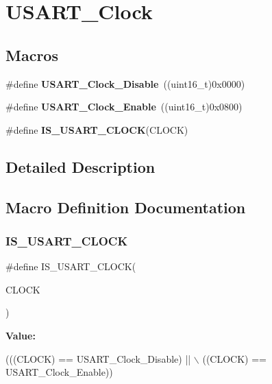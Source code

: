 \section{U\+S\+A\+R\+T\+\_\+\+Clock}
\label{group__USART__Clock}
\subsection*{Macros}
\begin{DoxyCompactItemize}
\item 
\#define \textbf{ U\+S\+A\+R\+T\+\_\+\+Clock\+\_\+\+Disable}~((uint16\+\_\+t)0x0000)
\item 
\#define \textbf{ U\+S\+A\+R\+T\+\_\+\+Clock\+\_\+\+Enable}~((uint16\+\_\+t)0x0800)
\item 
\#define \textbf{ I\+S\+\_\+\+U\+S\+A\+R\+T\+\_\+\+C\+L\+O\+CK}(C\+L\+O\+CK)
\end{DoxyCompactItemize}


\subsection{Detailed Description}


\subsection{Macro Definition Documentation}
\mbox{\label{group__USART__Clock_ga0f1e1ba37690b21b7338ed3b06614cf6}} 
\subsubsection{I\+S\+\_\+\+U\+S\+A\+R\+T\+\_\+\+C\+L\+O\+CK}
{\footnotesize\ttfamily \#define I\+S\+\_\+\+U\+S\+A\+R\+T\+\_\+\+C\+L\+O\+CK(\begin{DoxyParamCaption}\item[{}]{C\+L\+O\+CK }\end{DoxyParamCaption})}

{\bfseries Value\+:}
\begin{DoxyCode}
(((CLOCK) == USART_Clock_Disable) || \(\backslash\)
                               ((CLOCK) == USART_Clock_Enable))
\end{DoxyCode}


